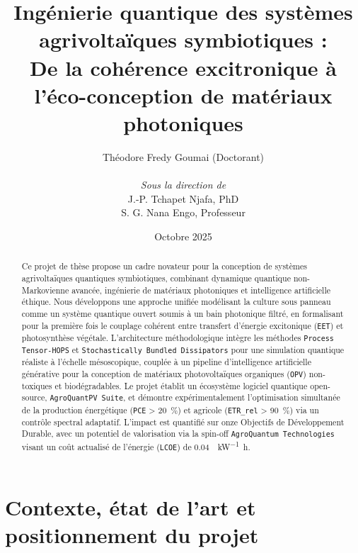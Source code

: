 \documentclass[12pt, a4paper]{article}
\begin{document}
\title{\huge Ingénierie quantique des systèmes agrivoltaïques symbiotiques :\\ De la cohérence excitronique à l'éco-conception de matériaux photoniques}
\author{
    Théodore Fredy Goumai (Doctorant) \\
    \\
    \textit{Sous la direction de} \\
    J.-P. Tchapet Njafa, PhD \\
    S. G. Nana Engo, Professeur
}
\date{Octobre 2025}

\maketitle
\thispagestyle{empty}
\newpage

\begin{abstract}
Ce projet de thèse propose un cadre novateur pour la conception de systèmes agrivoltaïques quantiques symbiotiques, combinant dynamique quantique non-Markovienne avancée, ingénierie de matériaux photoniques et intelligence artificielle éthique. Nous développons une approche unifiée modélisant la culture sous panneau comme un système quantique ouvert soumis à un bain photonique filtré, en formalisant pour la première fois le couplage cohérent entre transfert d'énergie excitonique (\texttt{EET}) et photosynthèse végétale. L'architecture méthodologique intègre les méthodes \texttt{Process Tensor-HOPS} et \texttt{Stochastically Bundled Dissipators} pour une simulation quantique réaliste à l'échelle mésoscopique, couplée à un pipeline d'intelligence artificielle générative pour la conception de matériaux photovoltaïques organiques (\texttt{OPV}) non-toxiques et biodégradables. Le projet établit un écosystème logiciel quantique open-source, \texttt{AgroQuantPV Suite}, et démontre expérimentalement l'optimisation simultanée de la production énergétique (\texttt{PCE} > \SI{20}{\percent}) et agricole (\texttt{ETR\_{rel}} > \SI{90}{\percent}) via un contrôle spectral adaptatif. L'impact est quantifié sur onze Objectifs de Développement Durable, avec un potentiel de valorisation via la spin-off \texttt{AgroQuantum Technologies} visant un coût actualisé de l'énergie (\texttt{LCOE}) de \SI{0.04}{\dollar\per\kilo\watt\hour}.
\end{abstract}
\newpage

\tableofcontents
\newpage
\setcounter{page}{1}

\section{Contexte, état de l'art et positionnement du projet}
\end{document}
